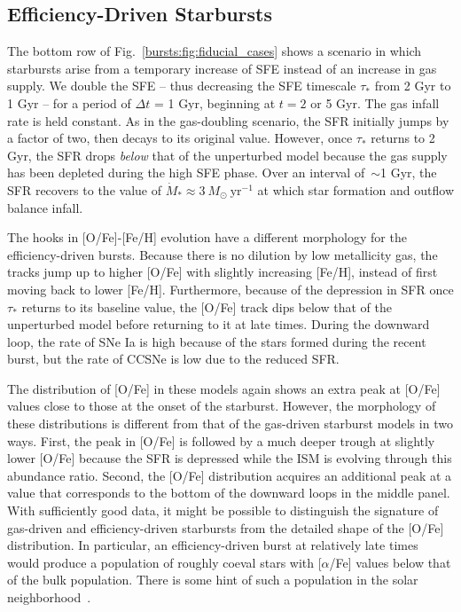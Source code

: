 \subsection{Efficiency-Driven Starbursts}
\label{bursts:sec:efficiency-driven}
The bottom row of Fig.~\ref{bursts:fig:fiducial_cases} shows a scenario in which 
starbursts arise from a temporary increase of SFE instead of an increase in 
gas supply. We double the SFE -- thus decreasing the SFE timescale $\tau_*$ 
from 2 Gyr to 1 Gyr -- for a period of $\Delta t$ = 1 Gyr, beginning at $t = 2$ 
or 5 Gyr. The gas infall rate is held constant. As in the gas-doubling 
scenario, the SFR initially jumps by a factor of two, then decays to its 
original value. However, once $\tau_*$ returns to 2 Gyr, the SFR drops 
\textit{below} that of the unperturbed model because the gas supply has been 
depleted during the high SFE phase. Over an interval of~$\sim$1 Gyr, the SFR 
recovers to the value of $\dot{M}_*\approx3\ M_\odot\ \text{yr}^{-1}$ at which 
star formation and outflow balance infall. 
\par 
The hooks in [O/Fe]-[Fe/H] evolution have a different morphology for the 
efficiency-driven bursts. Because there is no dilution by low metallicity gas, 
the tracks jump up to higher [O/Fe] with slightly increasing [Fe/H], instead 
of first moving back to lower [Fe/H]. Furthermore, because of the depression 
in SFR once $\tau_*$ returns to its baseline value, the [O/Fe] track dips 
below that of the unperturbed model before returning to it at late 
times. During the downward loop, the rate of SNe Ia is high because of the 
stars formed during the recent burst, but the rate of CCSNe is low due to the 
reduced SFR. 
\par 
The distribution of [O/Fe] in these models again shows an extra peak at [O/Fe] 
values close to those at the onset of the starburst. However, the morphology 
of these distributions is different from that of the gas-driven starburst 
models in two ways. First, the peak in [O/Fe] is followed by a much deeper 
trough at slightly lower [O/Fe] because the SFR is depressed while the ISM is 
evolving through this abundance ratio. Second, the [O/Fe] distribution 
acquires an additional peak at a value that corresponds to the bottom of the 
downward loops in the middle panel. With sufficiently good data, it might be 
possible to distinguish the signature of gas-driven and efficiency-driven 
starbursts from the detailed shape of the [O/Fe] distribution. In particular, 
an efficiency-driven burst at relatively late times would produce a population 
of roughly coeval stars with [$\alpha$/Fe] values below that of the bulk 
population. There is some hint of such a population in the solar 
neighborhood~\citep{Feuillet2018}. 

